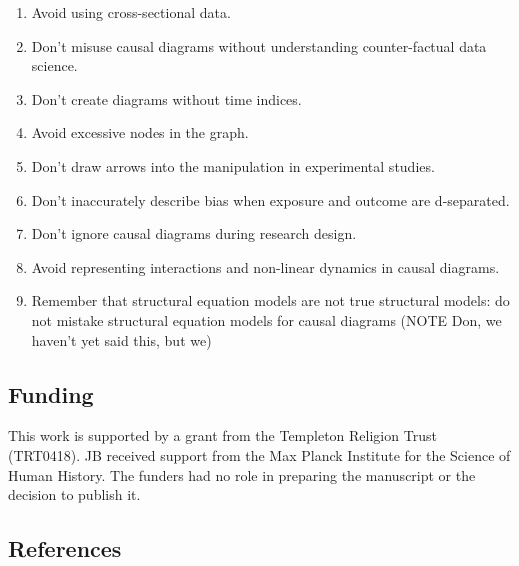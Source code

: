 \documentclass[
  singlecolumn]{article}
\providecommand{\tightlist}{%
  \setlength{\itemsep}{0pt}\setlength{\parskip}{0pt}}\usepackage{longtable,booktabs,array}
\begin{document}
\begin{enumerate}
\def\labelenumi{\arabic{enumi}.}
\tightlist
\item
  Avoid using cross-sectional data.
\item
  Don't misuse causal diagrams without understanding counter-factual
  data science.
\item
  Don't create diagrams without time indices.
\item
  Avoid excessive nodes in the graph.
\item
  Don't draw arrows into the manipulation in experimental studies.
\item
  Don't inaccurately describe bias when exposure and outcome are
  d-separated.
\item
  Don't ignore causal diagrams during research design.
\item
  Avoid representing interactions and non-linear dynamics in causal
  diagrams.
\item
  Remember that structural equation models are not true structural
  models: do not mistake structural equation models for causal diagrams
  (NOTE Don, we haven't yet said this, but we)
\end{enumerate}

\newpage{}

\subsection{Funding}\label{funding}

This work is supported by a grant from the Templeton Religion Trust
(TRT0418). JB received support from the Max Planck Institute for the
Science of Human History. The funders had no role in preparing the
manuscript or the decision to publish it.

\subsection{References}\label{references}
\end{document}
